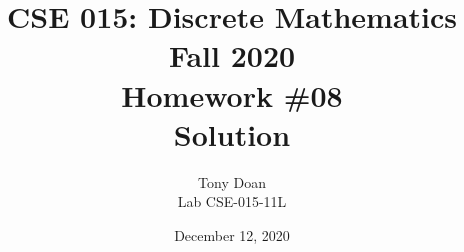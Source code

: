 \documentclass[11pt]{article}
\begin{document}
\author{Tony Doan \\
Lab CSE-015-11L }

\title{CSE 015: Discrete Mathematics\\
Fall 2020\\
Homework \#08\\
Solution}

\date{December 12, 2020}
\maketitle

\end{document}
